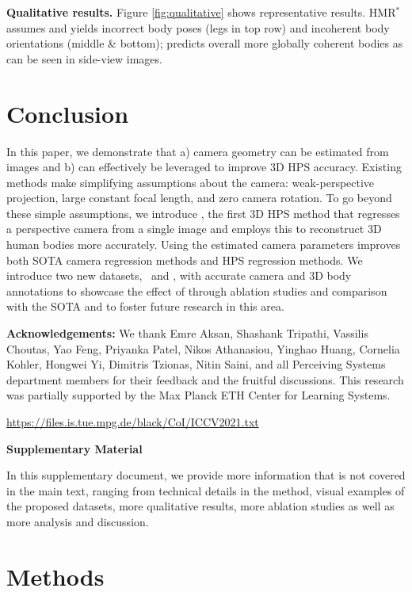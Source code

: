 \documentclass[10pt,twocolumn,letterpaper,usenames,dvipsnames]{article}
\begin{document}
\textbf{Qualitative results.}
Figure \ref{fig:qualitative} shows representative results.
HMR$^{*}$ assumes \iwcam and yields incorrect body poses (legs in top row) and incoherent body orientations (middle \& bottom);
\methodname predicts overall more globally coherent bodies as can be seen in side-view images.  \section{Conclusion}
\label{conclusion}
In this paper, we demonstrate that a) camera geometry can be estimated from images and b) can effectively be leveraged to improve 3D HPS accuracy. 
Existing methods make simplifying assumptions about the camera: weak-perspective projection, large constant focal length, and zero camera rotation. 
To go beyond these simple assumptions, we introduce \methodname, the first 3D HPS method that regresses a perspective camera from a single image and employs this to reconstruct 3D human bodies more accurately.
Using the estimated camera parameters improves both SOTA camera regression methods and HPS regression methods.
We introduce two new datasets, \ie~\mtpcam and \agoracam, with accurate camera and 3D body annotations to showcase the effect of \methodname through ablation studies and comparison with the SOTA and to foster future research in this area. \small{
\noindent
{\bf Acknowledgements:}
We thank Emre Aksan, Shashank Tripathi, Vassilis Choutas, Yao Feng, Priyanka Patel, Nikos Athanasiou, Yinghao Huang, Cornelia Kohler, Hongwei Yi, Dimitris Tzionas, Nitin Saini, and all Perceiving Systems department members for their feedback and the fruitful discussions. This research was partially supported by the Max Planck ETH Center for Learning Systems.

 \url{https://files.is.tue.mpg.de/black/CoI/ICCV2021.txt}
} 
{\small

\balance

}
	\newpage
\appendix
	{\noindent\Large\textbf{Supplementary Material}}
	\newline
	\setcounter{page}{1}
	
	In this supplementary document, we provide more information that is not covered in the main text, ranging from technical details in the method, visual examples of the proposed datasets, more qualitative results, more ablation studies as well as more analysis and discussion.

    \section{Methods}
\end{document}
